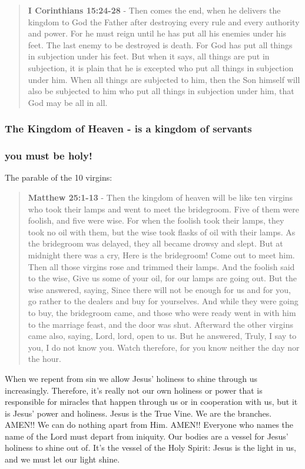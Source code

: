 \documentclass[11pt]{article}
\begin{document}
\begin{quote}
\textbf{I Corinthians 15:24-28} - Then comes the end, when he delivers the kingdom to God the Father after destroying every rule and every authority and power. For he must reign until he has put all his enemies under his feet. The last enemy to be destroyed is death. For God has put all things in subjection under his feet. But when it says, all things are put in subjection, it is plain that he is excepted who put all things in subjection under him. When all things are subjected to him, then the Son himself will also be subjected to him who put all things in subjection under him, that God may be all in all.
\end{quote}

\subsubsection{The Kingdom of Heaven - is a kingdom of servants}
\label{sec:org58ff523}
\subsubsection{you must be holy!}
\label{sec:org903743b}
The parable of the 10 virgins:

\begin{quote}
\textbf{Matthew 25:1-13} - Then the kingdom of heaven will be like ten virgins who took their lamps and went to meet the bridegroom. Five of them were foolish, and five were wise. For when the foolish took their lamps, they took no oil with them, but the wise took flasks of oil with their lamps. As the bridegroom was delayed, they all became drowsy and slept. But at midnight there was a cry, Here is the bridegroom! Come out to meet him. Then all those virgins rose and trimmed their lamps. And the foolish said to the wise, Give us some of your oil, for our lamps are going out. But the wise answered, saying, Since there will not be enough for us and for you, go rather to the dealers and buy for yourselves. And while they were going to buy, the bridegroom came, and those who were ready went in with him to the marriage feast, and the door was shut. Afterward the other virgins came also, saying, Lord, lord, open to us. But he answered, Truly, I say to you, I do not know you. Watch therefore, for you know neither the day nor the hour.
\end{quote}

When we repent from sin we allow Jesus' holiness to shine through us increasingly.
Therefore, it's really not our own holiness or power that is responsible for miracles that happen through us or in cooperation with us, but it is Jesus' power and holiness.
Jesus is the True Vine. We are the branches. AMEN!! We can do nothing apart from Him. AMEN!!
Everyone who names the name of the Lord must depart from iniquity.
Our bodies are a vessel for Jesus' holiness to shine out of. It's the vessel of the Holy Spirit:
Jesus is the light in us, and we must let our light shine.
\end{document}
